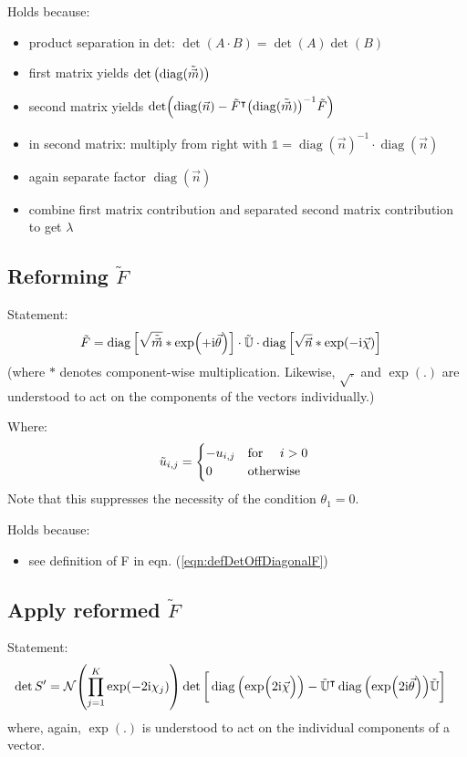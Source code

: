 \documentclass[
	english,
	a4paper,
	fontsize=10pt,
	parskip=half,
	titlepage=true,
	DIV=12,
	final
]{scrreprt}
\newcommand*{\transp}{\ensuremath{^\intercal}}
\newcommand*{\iunit}{\ensuremath{\mathrm{i}}}
\DeclareMathOperator{\diag}{diag}
\begin{document}
Holds because:
\begin{itemize}
\item product separation in det: $\det(A \cdot B) = \det(A) \det(B)$
\item first matrix yields $\det\qty( \diag(\tilde{\vec{m}}) )$
\item second matrix yields $\det( \diag(\vec{n}) - \tilde{F}\transp \qty(\diag(\tilde{\vec{m}}))^{-1}\tilde{F} )$
\item in second matrix: multiply from right with $\mathds{1} = \diag(\vec{n})^{-1} \cdot \diag(\vec{n})$
\item again separate factor $\diag(\vec{n})$
\item combine first matrix contribution and separated second matrix contribution to get $\lambda$
\end{itemize}

\subsection{Reforming $\tilde{F}$}
Statement:
\begin{align}
	\tilde{F}
&=
	\diag\qty[ \sqrt{ \tilde{\vec{m}}} * \exp(+\iunit \vec{\theta}) ]
	\cdot \tilde{\mathbb{U}} \cdot
	\diag\qty[ \sqrt{        \vec{n} } * \exp(-\iunit \vec{\chi  }) ]
\end{align}
(where $*$ denotes component-wise multiplication. Likewise, $\sqrt{.}$ and $\exp(.)$ are understood to act on the components of the vectors individually.)

Where:
\begin{equation}
	\tilde{u}_{i,j} = \begin{cases}
		-u_{i,j}		&\qq*{for } i > 0 \\
		0			&\qotherwise*
	\end{cases}
\end{equation}
Note that this suppresses the necessity of the condition $\theta_1 = 0$.

Holds because:
\begin{itemize}
\item see definition of F in eqn. (\ref{eqn:defDetOffDiagonalF})
\end{itemize}

\subsection{Apply reformed $\tilde{F}$}
Statement:
\begin{align}
	\det S'
&=
	\mathcal{N}
	\qty( \prod_{j=1}^{K} \exp(-2\iunit \chi_j) )
	\det\qty[\bigg.
		\diag\qty(\exp(\Big.2\iunit\vec{\chi}))
		-
		\tilde{\mathbb{U}}\transp
		\diag\qty(\exp(2\iunit\vec{\theta}))
		\tilde{\mathbb{U}}
	]
\end{align}
where, again, $\exp(.)$ is understood to act on the individual components of a vector.
\end{document}

